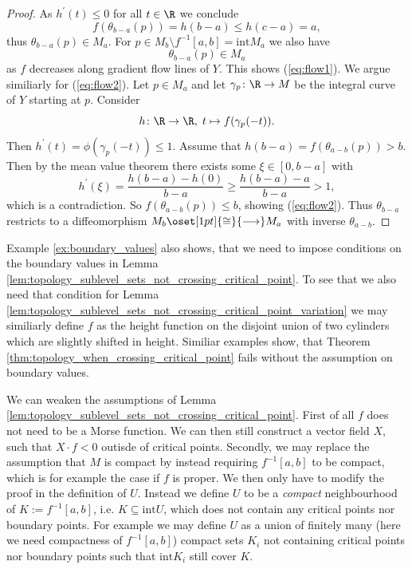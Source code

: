 \begin{proof}
        As $h^\prime(t) \leq 0$ for all $t \in \R$ we conclude
        \[
        f(\theta_{b-a}(p)) = h(b-a) \leq h(c-a) = a,
        \]
        thus $\theta_{b-a}(p) \in M_a$. For $p \in M_b \setminus f^{-1}[a,b] = \mathrm{int}{M_a}$ we also have 
        \[
        \theta_{b-a}(p) \in M_a
        \]
        as $f$ decreases along gradient flow lines of $Y$. This shows (\ref{eq:flow1}). We argue similiarly for (\ref{eq:flow2}). Let $p \in M_a$ and let $\gamma_p \colon \R \to M$ be the integral curve of $Y$ starting at $p$. Consider
        \[
        h \colon \R \to \R, \; t \mapsto f(\gamma_p(-t)).
        \]
        Then $h^\prime(t) = \phi(\gamma_p(-t)) \leq 1$. Assume that $h(b-a) = f(\theta_{a-b}(p)) > b$. Then by the mean value theorem there exists some $\xi \in [0,b-a]$ with 
        \[
        h^\prime(\xi) = \frac{h(b-a) - h(0)}{b-a} \geq \frac{h(b-a) - a}{b-a} > 1,
        \]
        which is a contradiction. So $f(\theta_{a-b}(p)) \leq b$, showing (\ref{eq:flow2}). Thus $\theta_{b-a}$ restricts to a diffeomorphism $M_b \oset[1pt]{\cong}{\longrightarrow} M_a$ with inverse $\theta_{a-b}$.
    \end{proof}

    \begin{counterexample}
        Example \ref{ex:boundary_values} also shows, that we need to impose conditions on the boundary values in Lemma \ref{lem:topology_sublevel_sets_not_crossing_critical_point}. To see that we also need that condition for Lemma \ref{lem:topology_sublevel_sets_not_crossing_critical_point_variation} we may similiarly define $f$ as the height function on the disjoint union of two cylinders which are slightly shifted in height. Similiar examples show, that Theorem \ref{thm:topology_when_crossing_critical_point} fails without the assumption on boundary values.
    \end{counterexample}

    \begin{remark}
        We can weaken the assumptions of Lemma \ref{lem:topology_sublevel_sets_not_crossing_critical_point}. First of all $f$ does not need to be a Morse function. We can then still construct a vector field $X$, such that $X \cdot f < 0$ outisde of critical points. Secondly, we may replace the assumption that $M$ is compact by instead requiring $f^{-1}[a,b]$ to be compact, which is for example the case if $f$ is proper. We then only have to modify the proof in the definition of $U$. Instead we define $U$ to be a \textit{compact} neighbourhood of $K := f^{-1}[a,b]$, i.e. $K \subseteq \mathrm{int} U$, which does not contain any critical points nor boundary points. For example we may define $U$ as a union of finitely many (here we need compactness of $f^{-1}[a,b]$) compact sets $K_i$ not containing critical points nor boundary points such that $\mathrm{int} K_i$ still cover $K$. 
    \end{remark}

